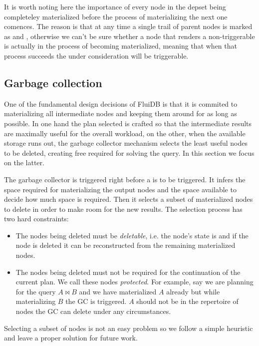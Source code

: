 It is worth noting here the importance of every node in the depset
being completeley materialized before the process of materializing the
next one comences. The reason is that at any time a single trail of
parent nodes is marked as  and , otherwise we can't
be sure whether a  node that renders a 
non-triggerable is actually in the process of becoming materialized,
meaning that when that process succeeds the  under
consideration will be triggerable.

\subsection{Garbage collection}

One of the fundamental design decisions of FluiDB is that it is
commited to materializing all intermediate nodes and keeping them
around for as long as possible. In one hand the plan selected is
crafted so that the intermediate results are maximally useful for the
overall workload, on the other, when the available storage runs out,
the garbage collector mechanism selects the least useful nodes to be
deleted, creating free required for solving the query. In this section
we focus on the latter.

The garbage collector is triggered right before a  is to be
triggered. It infers the space required for materializing the output
nodes and the space available to decide how much space is
required. Then it selects a subset of materialized nodes to delete in
order to make room for the new results. The selection process has two
hard constraints:

\begin{itemize}
\item The nodes being deleted must be \emph{deletable}, i.e. the
  node's state is  and if the node is deleted it can be
  reconstructed from the remaining materialized nodes.
\item The nodes being deleted must not be required for the
  continuation of the current plan. We call these nodes
  \emph{protected}. For example, say we are planning for the query
  \(A \Join B\) and we have materialized \(A\) already but while
  materializing \(B\) the GC is triggered. \(A\) should not be in the
  repertoire of nodes the GC can delete under any circumstances.
\end{itemize}

Selecting a subset of nodes is not an easy problem so we follow a
simple heuristic and leave a proper solution for future work.

